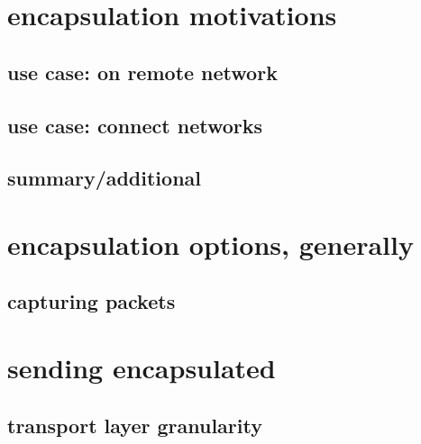 
\section{encapsulation motivations}
\subsection{use case: on remote network}

\subsection{use case: connect networks}




\subsection{summary/additional}




\section{encapsulation options, generally}


\subsection{capturing packets}


\section{sending encapsulated}

\subsection{transport layer granularity}


